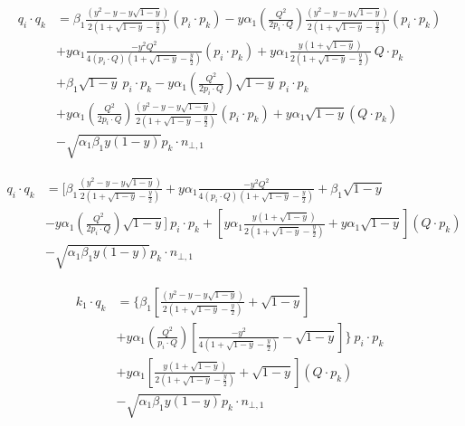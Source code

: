 \begin{equation}
	\begin{aligned}
	q_i \cdot q_k &= \beta_1 \frac{(y^2 -y-y\sqrt{1-y}) }{2(1+\sqrt{1-y}-\frac{y}{2})}(p_{i}\cdot {p_k})
	-y\alpha_1(\frac{Q^2}{2p_i \cdot Q})\frac{(y^2 -y-y\sqrt{1-y})}{2(1+\sqrt{1-y}-\frac{y}{2})}(p_{i}\cdot {p_k})\\
&+y\alpha_1\frac{-y^2 Q^2 }{4(p_i\cdot Q)(1+\sqrt{1-y}-\frac{y}{2})}(p_{i}\cdot {p_k})+ y\alpha_1\frac{y(1+\sqrt{1-y})}{2(1+\sqrt{1-y}-\frac{y}{2})}\:Q \cdot p_k\\
	&+\beta_1 \sqrt{1-y}\:p_i \cdot p_k-y\alpha_1(\frac{Q^2}{2p_i \cdot Q})\sqrt{1-y}\:p_i \cdot p_k\\
	&+y\alpha_1(\frac{Q^2}{2p_i \cdot Q})\frac{(y^2 -y-y\sqrt{1-y})}{2(1+\sqrt{1-y}-\frac{y}{2})}(p_{i}\cdot {p_k})+y\alpha_1\sqrt{1-y}(Q\cdot p_k)\\
	&-\sqrt{\alpha_1\beta_1y(1-y)} p_k \cdot {n_{\bot,1}} 
    \end{aligned}
\end{equation}

\begin{equation}
	\begin{aligned}
	q_i \cdot q_k &= [\beta_1 \frac{(y^2 -y-y\sqrt{1-y}) }{2(1+\sqrt{1-y}-\frac{y}{2})}+y\alpha_1\frac{-y^2 Q^2 }{4(p_i\cdot Q)(1+\sqrt{1-y}-\frac{y}{2})}+\beta_1 \sqrt{1-y}\\&-y\alpha_1(\frac{Q^2}{2p_i \cdot Q})\sqrt{1-y}]\:p_i \cdot p_k+[y\alpha_1\frac{y(1+\sqrt{1-y})}{2(1+\sqrt{1-y}-\frac{y}{2})}+y\alpha_1\sqrt{1-y}](Q\cdot p_k)\\
	&-\sqrt{\alpha_1\beta_1y(1-y)} p_k \cdot {n_{\bot,1}} 
    \end{aligned}
\end{equation}

\begin{equation}
	\begin{aligned}
	k_1 \cdot q_k &= \lbrace\beta_1 [\frac{(y^2 -y-y\sqrt{1-y}) }{2(1+\sqrt{1-y}-\frac{y}{2})}+ \sqrt{1-y}]\\
	&+y\alpha_1(\frac{Q^2}{p_i \cdot Q})[\frac{-y^2 }{4(1+\sqrt{1-y}-\frac{y}{2})}-\sqrt{1-y}]\rbrace\:p_i \cdot p_k\\
	&+y\alpha_1[\frac{y(1+\sqrt{1-y})}{2(1+\sqrt{1-y}-\frac{y}{2})}+\sqrt{1-y}](Q\cdot p_k)\\
	&-\sqrt{\alpha_1\beta_1y(1-y)} p_k \cdot {n_{\bot,1}} 
    \end{aligned}
\end{equation}

